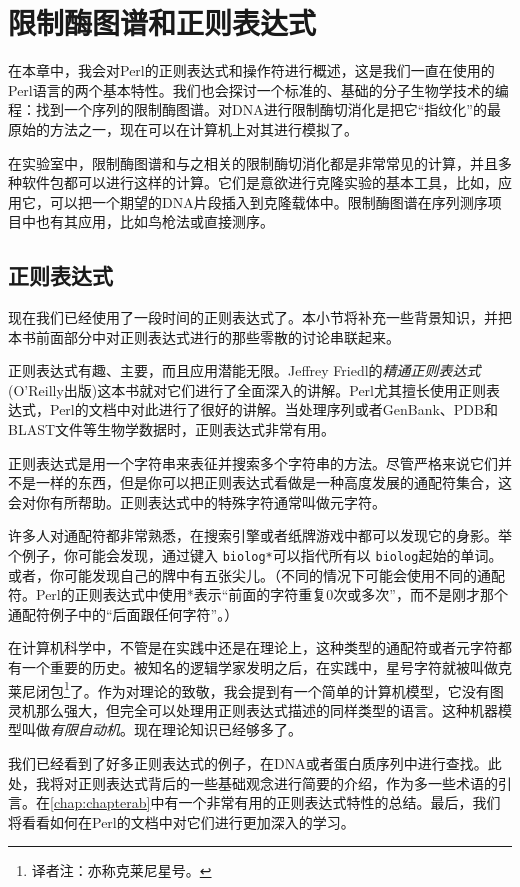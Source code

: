 \chapter{限制酶图谱和正则表达式}
\label{chap:chapter9}
\minitoc

在本章中，我会对Perl的正则表达式和操作符进行概述，这是我们一直在使用的Perl语言的两个基本特性。我们也会探讨一个标准的、基础的分子生物学技术的编程：找到一个序列的限制酶图谱。对DNA进行限制酶切消化是把它“指纹化”的最原始的方法之一，现在可以在计算机上对其进行模拟了。

在实验室中，限制酶图谱和与之相关的限制酶切消化都是非常常见的计算，并且多种软件包都可以进行这样的计算。它们是意欲进行克隆实验的基本工具，比如，应用它，可以把一个期望的DNA片段插入到克隆载体中。限制酶图谱在序列测序项目中也有其应用，比如鸟枪法或直接测序。

\section{正则表达式}
现在我们已经使用了一段时间的正则表达式了。本小节将补充一些背景知识，并把本书前面部分中对正则表达式进行的那些零散的讨论串联起来。

正则表达式有趣、主要，而且应用潜能无限。Jeffrey
Friedl的\textit{精通正则表达式}
(O'Reilly出版)这本书就对它们进行了全面深入的讲解。Perl尤其擅长使用正则表达式，Perl的文档中对此进行了很好的讲解。当处理序列或者GenBank、PDB和BLAST文件等生物学数据时，正则表达式非常有用。

正则表达式是用一个字符串来表征并搜索多个字符串的方法。尽管严格来说它们并不是一样的东西，但是你可以把正则表达式看做是一种高度发展的通配符集合，这会对你有所帮助。正则表达式中的特殊字符通常叫做元字符。

许多人对通配符都非常熟悉，在搜索引擎或者纸牌游戏中都可以发现它的身影。举个例子，你可能会发现，通过键入 \verb|biolog*|可以指代所有以 \verb|biolog|起始的单词。或者，你可能发现自己的牌中有五张尖儿。（不同的情况下可能会使用不同的通配符。Perl的正则表达式中使用*表示“前面的字符重复0次或多次”，而不是刚才那个通配符例子中的“后面跟任何字符”。）

在计算机科学中，不管是在实践中还是在理论上，这种类型的通配符或者元字符都有一个重要的历史。被知名的逻辑学家发明之后，在实践中，星号字符就被叫做克莱尼闭包\footnote{译者注：亦称克莱尼星号。}了。作为对理论的致敬，我会提到有一个简单的计算机模型，它没有图灵机那么强大，但完全可以处理用正则表达式描述的同样类型的语言。这种机器模型叫做\textit{有限自动机}。现在理论知识已经够多了。

我们已经看到了好多正则表达式的例子，在DNA或者蛋白质序列中进行查找。此处，我将对正则表达式背后的一些基础观念进行简要的介绍，作为多一些术语的引言。在\autoref{chap:chapterab}中有一个非常有用的正则表达式特性的总结。最后，我们将看看如何在Perl的文档中对它们进行更加深入的学习。

